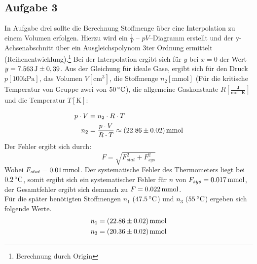 \subsection{Aufgabe 3}
In Aufgabe drei sollte die Berechnung Stoffmenge über eine Interpolation zu einem Volumen erfolgen. Hierzu wird ein $\frac{1}{V}$ -- $pV$--Diagramm erstellt und der y-Achsenabschnitt über ein Ausgleichspolynom 3ter Ordnung ermittelt (Reihenentwicklung).\footnote{Berechnung durch Origin} Bei der Interpolation ergibt sich für $y$ bei $x=0$ der Wert $y=\unit[7.563]{J}  \pm 0,39$. Aus der Gleichung für ideale Gase, ergibt sich für den Druck $p [\mathrm{100kPa}]$, das Volumen $V [\mathrm{cm^3}]$, die Stoffmenge $n_2 [\mathrm{mmol}]$ (Für die kritische Temperatur von Gruppe zwei von $\unit[50]{^\circ C}$), die allgemeine Gaskonstante $R [\mathrm{\frac{J}{mol \cdot K}}]$ und die Temperatur $T [\mathrm{K}]$:

\begin{align}
p \cdot V &= n_2 \cdot R \cdot T\\
n_2 &= \frac{p \cdot V}{R \cdot T} \approx \unit[(22.86 \pm 0.02)]{mmol} \notag
\end{align}
Der Fehler ergibt sich durch:
\[
F = \sqrt{F_{stat}^2 + F_{sys}^2}
\]
Wobei $F_{stat} = \unit[0.01]{mmol}$. Der systematische Fehler des Thermometers liegt bei $\unit[0.2]{^\circ C}$, somit ergibt sich ein systematischer Fehler für $n$ von $F_{sys} = \unit[0.017]{mmol}$, der Gesamtfehler ergibt sich demnach zu $F = \unit[0.022]{mmol}$. \\
Für die später benötigten Stoffmengen $n_1$ ($\unit[47.5]{^\circ C}$) und $n_3$ ($\unit[55]{^\circ C}$) ergeben sich folgende Werte.
\begin{align*}
n_1 &= \unit[(22.86 \pm 0.02)]{mmol}\\
n_3 &= \unit[(20.36 \pm 0.02)]{mmol}
\end{align*}